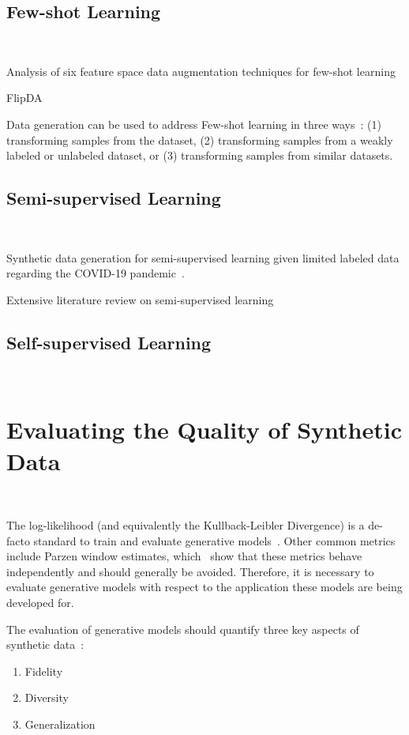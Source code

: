 \documentclass[parskip=full]{scrartcl}
\begin{document}
\subsection{Few-shot Learning}~\label{sec:few-shot-learning}

Analysis of six feature space data augmentation techniques for few-shot
learning~\cite{kumar2019closer}

FlipDA~\cite{zhou2021flipda}

Data generation can be used to address Few-shot learning in three
ways~\cite{wang2020generalizing}: (1) transforming samples from the dataset,
(2) transforming samples from a weakly labeled or unlabeled dataset, or (3)
transforming samples from similar datasets.

\subsection{Semi-supervised Learning}~\label{sec:semi-supervised-learning}

Synthetic data generation for semi-supervised learning given limited labeled
data regarding the COVID-19 pandemic~\cite{das2022conditional}.

Extensive literature review on semi-supervised learning~\cite{van2020survey}

\subsection{Self-supervised Learning}~\label{sec:self-supervised-learning}

\section{Evaluating the Quality of Synthetic Data
}~\label{sec:evaluating-synthetic-data}

The log-likelihood (and equivalently the Kullback-Leibler Divergence) is a
de-facto standard to train and evaluate generative
models~\cite{theis2016note}. Other common metrics include Parzen window
estimates, which~\citet{theis2016note} show that these metrics behave
independently and should generally be avoided. Therefore, it is necessary
to evaluate generative models with respect to the application these models are
being developed for.


The evaluation of generative models should quantify three key aspects of
synthetic data~\cite{alaa2022faithful}:

\begin{enumerate}
    \item Fidelity
    \item Diversity 
    \item Generalization
\end{enumerate}
\end{document}
